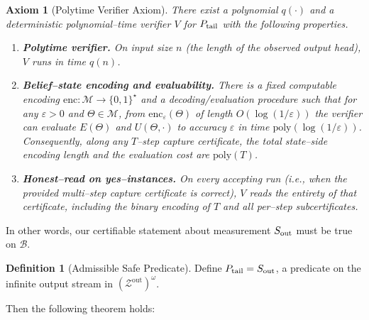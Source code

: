 \documentclass[12pt]{article}
\theoremstyle{definition}
\newtheorem{definition}{Definition}[section]
\theoremstyle{plain}
\newtheorem{axiom}{Axiom}[section]
\begin{document}
\begin{axiom}[Polytime Verifier Axiom]
\label{ax:polytime-verifier}
There exist a polynomial $q(\cdot)$ and a deterministic polynomial–time verifier $V$ for $P_{\rm tail}$ with the following properties.

\begin{enumerate}[label=(V\arabic*)]
  \item \textbf{Polytime verifier.} On input size $n$ (the length of the observed output head), $V$ runs in time $q(n)$.

  \item \textbf{Belief–state encoding and evaluability.} There is a fixed computable encoding $\mathrm{enc}:\mathcal M\to\{0,1\}^\star$ and a decoding/evaluation procedure such that for any $\varepsilon>0$ and $\Theta\in\mathcal M$, from $\mathrm{enc}_\varepsilon(\Theta)$ of length $O(\log(1/\varepsilon))$ the verifier can evaluate $E(\Theta)$ and $U(\Theta,\cdot)$ to accuracy $\varepsilon$ in time $\mathrm{poly}(\log(1/\varepsilon))$. Consequently, along any $T$–step capture certificate, the total state–side encoding length and the evaluation cost are $\mathrm{poly}(T)$.

  \item \textbf{Honest–read on yes–instances.} On every accepting run (i.e., when the provided multi–step capture certificate is correct), $V$ reads the entirety of that certificate, including the binary encoding of $T$ and all per–step subcertificates.
\end{enumerate}
\end{axiom}

In other words, our certifiable statement about measurement $S_{\rm out}$ must be true on $\mathcal{B}$.

\begin{definition}[Admissible Safe Predicate]
Define $P_{\text{tail}}=S_{\rm out}$, a predicate on the infinite output stream in $(\mathcal{Z}^{\text{out}})^\omega$.
\end{definition}

Then the following theorem holds:
\end{document}
